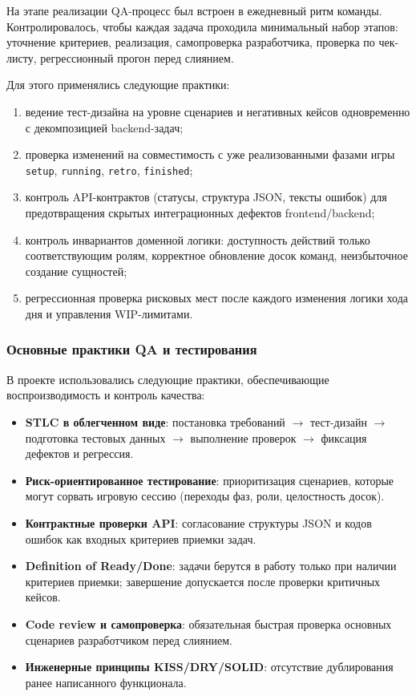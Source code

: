 На этапе реализации QA-процесс был встроен в ежедневный ритм команды. Контролировалось, чтобы каждая задача проходила минимальный набор этапов: уточнение критериев, реализация, самопроверка разработчика, проверка по чек-листу, регрессионный прогон перед слиянием.

Для этого применялись следующие практики:

\begin{enumerate}
    \item ведение тест-дизайна на уровне сценариев и негативных кейсов одновременно с декомпозицией backend-задач;
    \item проверка изменений на совместимость с уже реализованными фазами игры \texttt{setup}, \texttt{running}, \texttt{retro}, \texttt{finished};
    \item контроль API-контрактов (статусы, структура JSON, тексты ошибок) для предотвращения скрытых интеграционных дефектов frontend/backend;
    \item контроль инвариантов доменной логики: доступность действий только соответствующим ролям, корректное обновление досок команд, неизбыточное создание сущностей;
    \item регрессионная проверка рисковых мест после каждого изменения логики хода дня и управления WIP-лимитами.
\end{enumerate}

\subsubsection{Основные практики QA и тестирования}

В проекте использовались следующие практики, обеспечивающие воспроизводимость и контроль качества:

\begin{itemize}
    \item \textbf{STLC в облегченном виде}: постановка требований $\rightarrow$ тест-дизайн $\rightarrow$ подготовка тестовых данных $\rightarrow$ выполнение проверок $\rightarrow$ фиксация дефектов и регрессия.
    \item \textbf{Риск-ориентированное тестирование}: приоритизация сценариев, которые могут сорвать игровую сессию (переходы фаз, роли, целостность досок).
    \item \textbf{Контрактные проверки API}: согласование структуры JSON и кодов ошибок как входных критериев приемки задач.
    \item \textbf{Definition of Ready/Done}: задачи берутся в работу только при наличии критериев приемки; завершение допускается после проверки критичных кейсов.
    \item \textbf{Code review и самопроверка}: обязательная быстрая проверка основных сценариев разработчиком перед слиянием.
    \item \textbf{Инженерные принципы KISS/DRY/SOLID}: отсутствие дублирования ранее написанного функционала.
\end{itemize}

